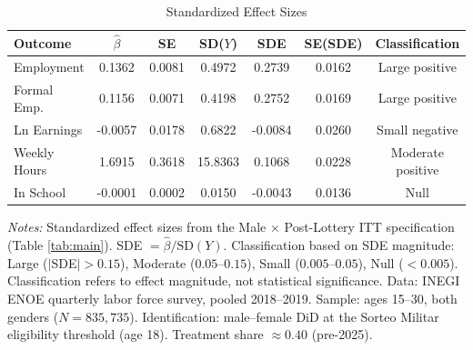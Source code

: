 \begin{table}[t]
\centering
\caption{Standardized Effect Sizes\label{tab:sde}}
\small
\begin{tabular}{lcccccc}
\toprule
Outcome & $\hat{\beta}$ & SE & SD($Y$) & SDE & SE(SDE) & Classification \\
\midrule
Employment & 0.1362 & 0.0081 & 0.4972 & 0.2739 & 0.0162 & Large positive \\
Formal Emp. & 0.1156 & 0.0071 & 0.4198 & 0.2752 & 0.0169 & Large positive \\
Ln Earnings & -0.0057 & 0.0178 & 0.6822 & -0.0084 & 0.0260 & Small negative \\
Weekly Hours & 1.6915 & 0.3618 & 15.8363 & 0.1068 & 0.0228 & Moderate positive \\
In School & -0.0001 & 0.0002 & 0.0150 & -0.0043 & 0.0136 & Null \\
\bottomrule
\end{tabular}
\begin{tablenotes}
\footnotesize
\item \textit{Notes:} Standardized effect sizes from the Male $\times$ Post-Lottery ITT specification (Table \ref{tab:main}). SDE $= \hat{\beta} / \text{SD}(Y)$. Classification based on SDE magnitude: Large ($|$SDE$|> 0.15$), Moderate ($0.05$--$0.15$), Small ($0.005$--$0.05$), Null ($< 0.005$). Classification refers to effect magnitude, not statistical significance. Data: INEGI ENOE quarterly labor force survey, pooled 2018--2019. Sample: ages 15--30, both genders ($N = 835{,}735$). Identification: male--female DiD at the Sorteo Militar eligibility threshold (age 18). Treatment share $\approx 0.40$ (pre-2025).
\end{tablenotes}
\end{table}
